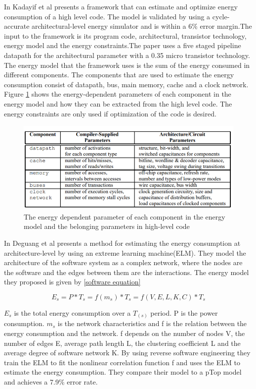 In \cite{EAC} Kadayif et al presents a framework that can estimate and optimize energy consumption of a high level code. The model is validated by using a cycle-accurate architectural-level energy simulator and is within a 6\% error margin.The input to the framework is its program code, architectural, transistor technology, energy model and the energy constraints.The paper uses a five staged pipeline datapath for the architectural parameter with a 0.35 micro transistor technology. The energy model that the framework uses is the sum of the energy consumed in different components. The components that are used to estimate the energy consumption consist of datapath, bus, main memory, cache and a clock network. Figure \ref{fig:EAC_table} shows the energy-dependent parameters of each component in the energy model and how they can be extracted from the high level code. The energy constraints are only used if optimization of the code is desired. 
\begin{figure}[H]
\centering
\includegraphics[height=4.5cm]{Project_Report/Images/EAC_table.PNG}
\caption{The energy dependent parameter of each component in the energy model and the belonging parameters in high-level code \cite{EAC}}
\label{fig:EAC_table}
\end{figure}
In \cite{Software_Energy} Deguang et al presents a method for estimating the energy consumption at architecture-level by using an extreme learning machine(ELM).  They model the architecture of the software system as a complex network, where the nodes are the software and the edges between them are the interactions. The energy model they proposed is given by \ref{software equation}

\begin{equation}
 E_{s}= P*T_{s} = f(m_{s})*T_{s}=f(V,E,L,K,C)*T_{s}
\label{software equation}
\end{equation}

$E_{s}$ is the total energy consumption over a $T_(s)$ period. P is the power consumption. $m_{s}$ is the network characteristics and f is the relation between the energy consumption and the network. f depends on the number of nodes V, the number of edges E, average path length L, the clustering coefficient L and the average degree of software network K. By using reverse software engineering they train the ELM to fit the nonlinear correlation function f and uses the ELM to estimate the energy consumption. They compare their model to a pTop model and achieves a 7.9\% error rate. 

